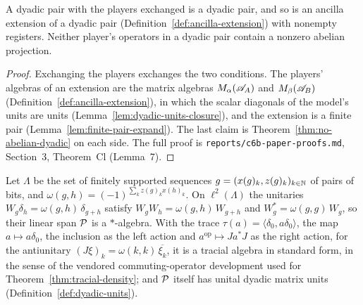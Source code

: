 \begin{lemma}
\label{lem:dyadic-pair-closure}
\leanok
A dyadic pair with the players exchanged is a dyadic pair, and so is an ancilla extension of a
dyadic pair (Definition~\ref{def:ancilla-extension}) with nonempty registers. Neither player's
operators in a dyadic pair contain a nonzero abelian projection.
\end{lemma}

\begin{proof}
\leanok
Exchanging the players exchanges the two conditions. The players' algebras of an extension are the
matrix algebras $M_\alpha(\alg_A)$ and $M_\beta(\alg_B)$ (Definition~\ref{def:ancilla-extension}),
in which the scalar diagonals of the model's units are units
(Lemma~\ref{lem:dyadic-units-closure}), and the extension is a finite pair
(Lemma~\ref{lem:finite-pair-expand}). The last claim is Theorem~\ref{thm:no-abelian-dyadic} on each
side. The full proof is \texttt{reports/c6b-paper-proofs.md}, Section~3, Theorem~Cl (Lemma~7).
\end{proof}

\begin{lemma}
\label{lem:pauli-algebra}
\leanok
Let $\Lambda$ be the set of finitely supported sequences $g = (x(g)_k, z(g)_k)_{k \in \N}$ of pairs
of bits, and $\omega(g, h) = (-1)^{\sum_k z(g)_k x(h)_k}$. On $\ell^2(\Lambda)$ the unitaries $W_g
\delta_h = \omega(g, h)\, \delta_{g + h}$ satisfy $W_g W_h = \omega(g, h)\, W_{g + h}$ and $W_g^* =
\omega(g, g)\, W_g$, so their linear span $\cal{P}$ is a $*$-algebra. With the trace $\tau(a) =
\langle \delta_0, a \delta_0 \rangle$, the map $a \mapsto a \delta_0$, the inclusion as the left
action and $a^{\mathrm{op}} \mapsto J a^* J$ as the right action, for the antiunitary $(J \xi)_k =
\omega(k, k)\, \overline{\xi_k}$, it is a tracial algebra in standard form, in the sense of the
vendored commuting-operator development used for Theorem~\ref{thm:tracial-density}; and $\cal{P}$
itself has unital dyadic matrix units (Definition~\ref{def:dyadic-units}).
\end{lemma}


